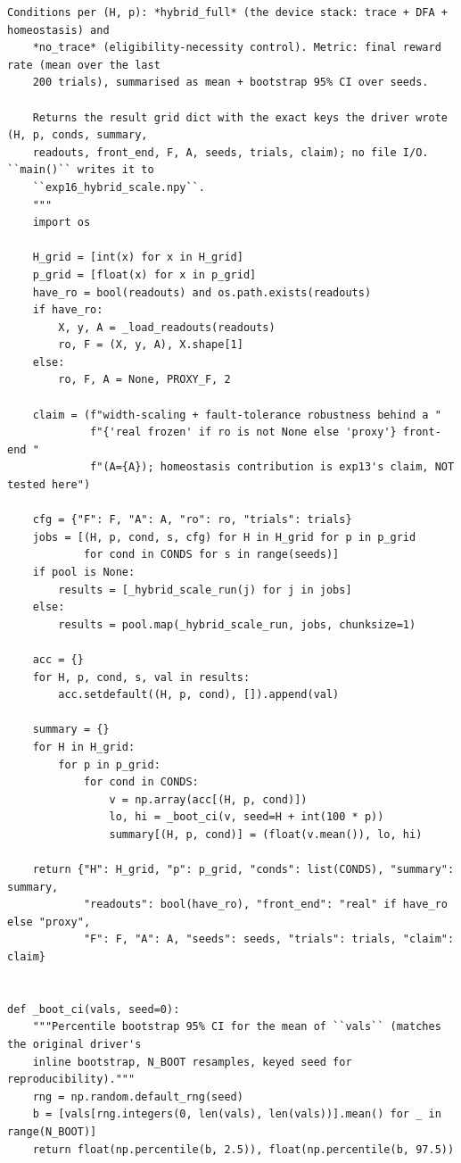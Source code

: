 \begin{lstlisting}[caption={mrl\_trace/hybrid.py},label={lst:siox-src-hybrid}]
    Conditions per (H, p): *hybrid_full* (the device stack: trace + DFA + homeostasis) and
    *no_trace* (eligibility-necessity control). Metric: final reward rate (mean over the last
    200 trials), summarised as mean + bootstrap 95% CI over seeds.

    Returns the result grid dict with the exact keys the driver wrote (H, p, conds, summary,
    readouts, front_end, F, A, seeds, trials, claim); no file I/O. ``main()`` writes it to
    ``exp16_hybrid_scale.npy``.
    """
    import os

    H_grid = [int(x) for x in H_grid]
    p_grid = [float(x) for x in p_grid]
    have_ro = bool(readouts) and os.path.exists(readouts)
    if have_ro:
        X, y, A = _load_readouts(readouts)
        ro, F = (X, y, A), X.shape[1]
    else:
        ro, F, A = None, PROXY_F, 2

    claim = (f"width-scaling + fault-tolerance robustness behind a "
             f"{'real frozen' if ro is not None else 'proxy'} front-end "
             f"(A={A}); homeostasis contribution is exp13's claim, NOT tested here")

    cfg = {"F": F, "A": A, "ro": ro, "trials": trials}
    jobs = [(H, p, cond, s, cfg) for H in H_grid for p in p_grid
            for cond in CONDS for s in range(seeds)]
    if pool is None:
        results = [_hybrid_scale_run(j) for j in jobs]
    else:
        results = pool.map(_hybrid_scale_run, jobs, chunksize=1)

    acc = {}
    for H, p, cond, s, val in results:
        acc.setdefault((H, p, cond), []).append(val)

    summary = {}
    for H in H_grid:
        for p in p_grid:
            for cond in CONDS:
                v = np.array(acc[(H, p, cond)])
                lo, hi = _boot_ci(v, seed=H + int(100 * p))
                summary[(H, p, cond)] = (float(v.mean()), lo, hi)

    return {"H": H_grid, "p": p_grid, "conds": list(CONDS), "summary": summary,
            "readouts": bool(have_ro), "front_end": "real" if have_ro else "proxy",
            "F": F, "A": A, "seeds": seeds, "trials": trials, "claim": claim}


def _boot_ci(vals, seed=0):
    """Percentile bootstrap 95% CI for the mean of ``vals`` (matches the original driver's
    inline bootstrap, N_BOOT resamples, keyed seed for reproducibility)."""
    rng = np.random.default_rng(seed)
    b = [vals[rng.integers(0, len(vals), len(vals))].mean() for _ in range(N_BOOT)]
    return float(np.percentile(b, 2.5)), float(np.percentile(b, 97.5))



\end{lstlisting}
